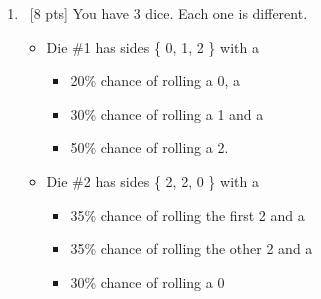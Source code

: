 \documentclass[12pt]{article}
\begin{document}
\begin{enumerate}
    \item \ [8 pts] You have 3 dice. Each one is different.
    \begin{itemize}
        \item Die \#1 has sides \{ 0, 1, 2 \} with a
        \begin{itemize}
            \item 20\% chance of rolling a 0, a
            \item 30\% chance of rolling a 1 and a
            \item 50\% chance of rolling a 2.
        \end{itemize}
        \item Die \#2 has sides \{ 2, 2, 0 \} with a
        \begin{itemize}
            \item 35\% chance of rolling the first 2 and a
            \item 35\% chance of rolling the other 2 and a
            \item 30\% chance of rolling a 0
        \end{itemize}


\end{itemize}
\end{enumerate}
\end{document}
